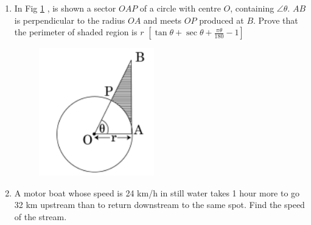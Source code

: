 \documentclass[book,11pt]{IEEEtran}
\renewcommand\thesection{\arabic{section}}
\begin{document}
\begin{enumerate}[label=\thesection.\arabic*.,ref=\thesection.\theenumi]
\item In Fig  \ref{figure_9} , is shown a sector $OAP$ of a circle with centre $O$, containing $\angle \theta$. $AB$ is perpendicular to the radius $OA$ and meets $OP$ produced at $B$. Prove that the perimeter of shaded region is $r$ $\left[\tan \theta + \sec \theta + \frac{\pi \theta}{180}-1 \right] $ \\

	\begin{figure}[h!]
      \centering
      \includegraphics[width=5cm]{figs/9.png}
     \caption{}
     \label{figure_9}
\end{figure} 


\item A motor boat whose speed is 24 km/h in still water takes 1 hour more to go 32 km upstream than to return downstream to the same spot. Find the speed of the stream.\\
\end{enumerate}
\end{document}
